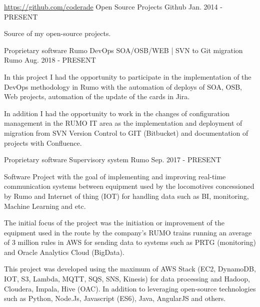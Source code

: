 

\begin{cventries}
  \cventry
    {\hyperref[https://github.com/coderade]{https://github.com/coderade}} %
    {Open Source Projects}%
    {Github} %
    {Jan. 2014 - PRESENT} %
    {
      \begin{cvitems} %
       \item{Source of my open-source projects.}
      \end{cvitems}
    }
  \cventry
    {Proprietary software} %
    {Rumo DevOps SOA/OSB/WEB | SVN to Git migration }%
    {Rumo} %
    {Aug. 2018 - PRESENT} %
    {
      \begin{cvitems} %
       \item{In this project I had the opportunity to participate in the implementation of the DevOps methodology in Rumo with the automation of deploys of SOA, OSB, Web projects, automation of the update of the cards in Jira.}
       \item{In addition I had the opportunity to work in the changes of configuration management in the RUMO IT area as the implementation and deployment of migration from SVN Version Control to GIT (Bitbucket) and documentation of projects with Confluence.}
      \end{cvitems}
    }
  \cventry
    {Proprietary software} %
    {Supervisory system}%
    {Rumo} %
    {Sep. 2017 - PRESENT} %
    {
      \begin{cvitems} %
       \item{Software Project with the goal of implementing and improving real-time communication systems between equipment used by the locomotives concessioned by Rumo and Internet of thing (IOT) for handling data such as BI, monitoring, Machine Learning and etc.}
       \item{The initial focus of the project was the initiation or improvement of the equipment used in the route by the company's RUMO trains running an average of 3 million rules in AWS for sending data to systems such as PRTG (monitoring) and Oracle Analytics Cloud (BigData).}
       \item{This project was developed using the maximum of AWS Stack (EC2, DynamoDB, IOT, S3, Lambda, MQTT, SQS, SNS, Kinesis) for data processing and Hadoop, Cloudera, Impala, Hive (OAC). In addition to leveraging open-source technologies such as Python, Node.Js, Javascript (ES6), Java, AngularJS and others.}
      \end{cvitems}
    }


\end{cventries}
